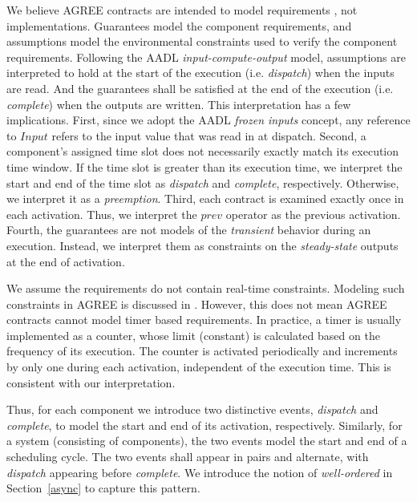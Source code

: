 We believe AGREE contracts are intended to model requirements \cite{AGREE2}, not implementations. Guarantees model the component requirements, and assumptions model the environmental constraints used to verify the component requirements. Following the AADL \emph{input-compute-output} model, assumptions are interpreted to hold at the start of the execution (i.e. \emph{dispatch}) when the inputs are read. And the guarantees shall be satisfied at the end of the execution (i.e. \emph{complete}) when the outputs are written. This interpretation has a few implications. 
First, since we adopt the AADL \textit{frozen inputs} concept, any reference to $Input$ refers to the input value that was read in at dispatch.
Second, a component's assigned time slot does not necessarily exactly match its execution time window. If the time slot is greater than its execution time, we interpret the start and end of the time slot as \textit{dispatch} and \textit{complete}, respectively. Otherwise, we interpret it as a \textit{preemption}.
Third, each contract is examined exactly once in each activation. Thus, we interpret the $prev$ operator as the previous activation. 
Fourth, the guarantees are not models of the \emph{transient} behavior during an execution. Instead, we interpret them as constraints on the \emph{steady-state} outputs at the end of activation.

We assume the requirements do not contain real-time constraints. Modeling such constraints in AGREE is discussed in \cite{rtAGREE}.
However, this does not mean AGREE contracts cannot model timer based requirements. In practice, a timer is usually implemented as a counter, whose limit (constant) is calculated based on the frequency of its execution. The counter is activated periodically and increments by only one during each activation, independent of the execution time. This is consistent with our interpretation.

Thus, for each component we introduce two distinctive events, \emph{dispatch} and \emph{complete}, to model the start and end of its activation, respectively. 
Similarly, for a system (consisting of components), the two events model the start and end of a scheduling cycle. 
The two events shall appear in pairs and alternate, with \emph{dispatch} appearing before \emph{complete}. We introduce the notion of \emph{well-ordered} in Section~\ref{async} to capture this pattern.

